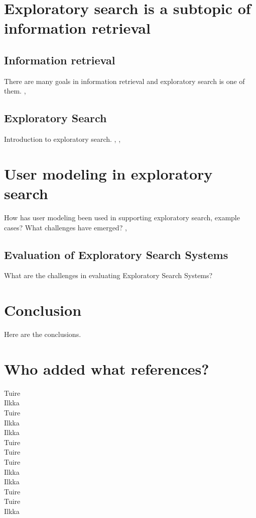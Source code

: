 \documentclass{sigchi}
\begin{document}
\section {Exploratory search is a subtopic of information retrieval}

\subsection{Information retrieval}
There are many goals in information retrieval and exploratory search is one of them.
\cite{hearst02}, \cite{kuhlt91}

\subsection{Exploratory Search}
Introduction to exploratory search.
\cite{march06}, \cite{white09}, \cite{tvaro11}

\section{User modeling in exploratory search}
How has user modeling been used in supporting exploratory search, example cases? What challenges have emerged? 
\cite{oconnor10}, \cite{sugi04}

\subsection{Evaluation of Exploratory Search Systems}
What are the challenges in evaluating Exploratory Search Systems?
\cite{whitemm08}

\section{Conclusion}
Here are the conclusions.

\section{Who added what references?}
\cite{rich99} Tuire \\
\cite{fischer01} Ilkka \\
\cite{dillon96} Tuire \\
\cite{bunt04} Ilkka \\
\cite{findlater04} Ilkka \\
\cite{hearst02} Tuire \\
\cite{kuhlt91} Tuire \\
\cite{march06} Tuire \\
\cite{white09} Ilkka \\
\cite{tvaro11} Ilkka \\
\cite{oconnor10} Tuire \\
\cite{sugi04} Tuire \\
\cite{whitemm08} Ilkka \\
\end{document}
